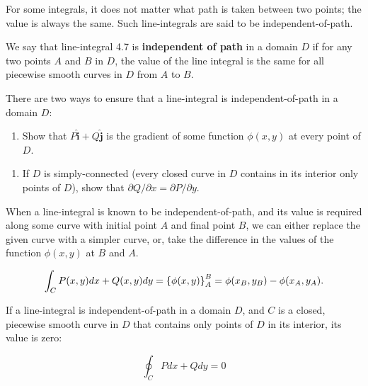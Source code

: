 \documentclass{article}
\begin{document}
\detach

\begin{remark}
For some integrals, it does not matter what path is taken between two points; the value is always the same. Such \@{line-integrals} are said to be \@{independent-of-path}.
\end{remark}

\begin{definition}
We say that \@{line-integral} 4.7 is \textbf{independent of path} in a \@{domain} $D$ if for any two points $A$ and $B$ in $D$, the value of the line integral is the same for all piecewise \@{smooth} curves in $D$ from $A$ to $B$.
\end{definition}

\begin{remark}
There are two ways to ensure that a \@{line-integral} is \@{independent-of-path} in a \@{domain} $D$:

\begin{enumerate}
\item Show that $P\mathbf{\hat{i}} + Q\mathbf{\hat{j}}$ is the \@{gradient} of some function $\phi(x,y)$ at every point of $D$.
\end{enumerate}

\begin{enumerate}
\item If $D$ is simply-connected (every closed curve in $D$ contains in its interior only points of $D$), show that $\partial Q/\partial x = \partial P / \partial y$.
\end{enumerate}
\end{remark}

\begin{theorem}\label{fundamental-theorem-of-line-integrals}
When a \@{line-integral} is known to be \@{independent-of-path}, and its value is required along some curve with initial point $A$ and final point $B$, we can either replace the given curve with a simpler curve, or, take the difference in the values of the function $\phi(x,y)$ at $B$ and $A$.

\[ \int_{C} P(x,y)dx + Q(x,y)dy = \left\{ \phi(x,y) \right\}_{A}^{B} = \phi(x_B, y_B) - \phi(x_A, y_A). \]
\end{theorem}

\begin{theorem}\label{closed-path-of-path-independent-integral-is-zero}
If a \@{line-integral} is \@{independent-of-path} in a \@{domain} $D$, and $C$ is a closed, piecewise \@{smooth} curve in $D$ that contains only points of $D$ in its interior, its value is zero:

\[ \oint_C Pdx + Qdy = 0 \]
\end{theorem}
\end{document}
